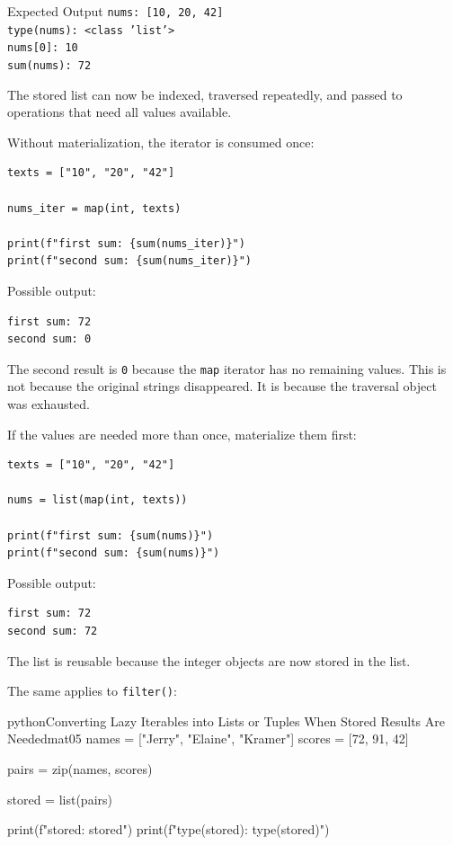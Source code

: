 \begin{iobox}{Expected Output}
\texttt{nums: [10, 20, 42]} \\
\texttt{type(nums): <class 'list'>} \\
\texttt{nums[0]: 10} \\
\texttt{sum(nums): 72} \\
\end{iobox}


The stored list can now be indexed, traversed repeatedly, and passed to operations that need all values available.

Without materialization, the iterator is consumed once:

\begin{verbatim}
texts = ["10", "20", "42"]

nums_iter = map(int, texts)

print(f"first sum: {sum(nums_iter)}")
print(f"second sum: {sum(nums_iter)}")
\end{verbatim}

Possible output:

\begin{verbatim}
first sum: 72
second sum: 0
\end{verbatim}

The second result is \texttt{0} because the \texttt{map} iterator has no remaining values. This is not because the original strings disappeared. It is because the traversal object was exhausted.

If the values are needed more than once, materialize them first:

\begin{verbatim}
texts = ["10", "20", "42"]

nums = list(map(int, texts))

print(f"first sum: {sum(nums)}")
print(f"second sum: {sum(nums)}")
\end{verbatim}

Possible output:

\begin{verbatim}
first sum: 72
second sum: 72
\end{verbatim}

The list is reusable because the integer objects are now stored in the list.

The same applies to \texttt{filter()}:

\begin{codebox}[]{python}{Converting Lazy Iterables into Lists or Tuples When Stored Results Are Needed}{mat05}
names = ["Jerry", "Elaine", "Kramer"]
scores = [72, 91, 42]

pairs = zip(names, scores)

stored = list(pairs)

print(f"stored: {stored}")
print(f"type(stored): {type(stored)}")
\end{codebox}


